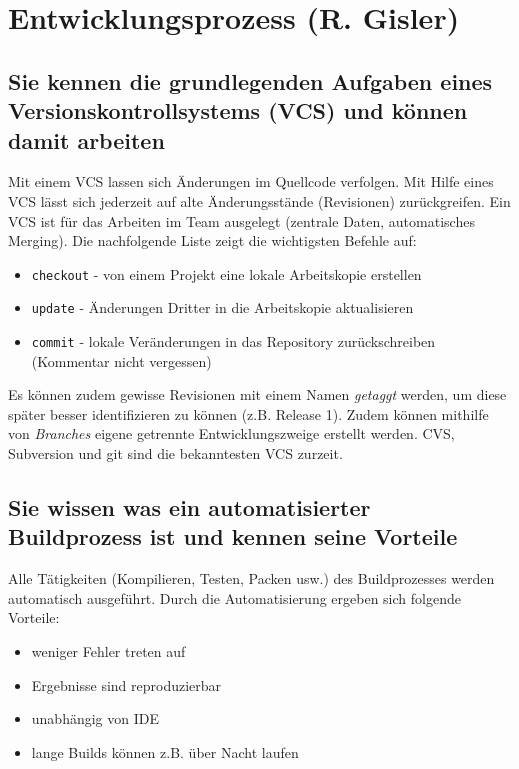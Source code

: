 \section{Entwicklungsprozess (R. Gisler)}
\label{sec:gisler}

\subsection{Sie kennen die grundlegenden Aufgaben eines Versionskontrollsystems (VCS) und können damit arbeiten}

Mit einem \ac{VCS} lassen sich Änderungen im Quellcode verfolgen. Mit Hilfe eines \ac{VCS} lässt sich jederzeit auf alte Änderungsstände (Revisionen) zurückgreifen. Ein \ac{VCS} ist für das Arbeiten im Team ausgelegt (zentrale Daten, automatisches Merging). Die nachfolgende Liste zeigt die wichtigsten Befehle auf:
\begin{itemize}
	\item \texttt{checkout} - von einem Projekt eine lokale Arbeitskopie erstellen
	\item \texttt{update} - Änderungen Dritter in die Arbeitskopie aktualisieren
	\item \texttt{commit} - lokale Veränderungen in das Repository zurückschreiben (Kommentar nicht vergessen)
\end{itemize}
Es können zudem gewisse Revisionen mit einem Namen \emph{getaggt} werden, um diese später besser identifizieren zu können (z.B. Release 1). Zudem können mithilfe von \emph{Branches} eigene getrennte Entwicklungszweige erstellt werden. CVS, Subversion und git sind die bekanntesten \ac{VCS} zurzeit. 

\subsection{Sie wissen was ein automatisierter Buildprozess ist und kennen seine Vorteile}

Alle Tätigkeiten (Kompilieren, Testen, Packen usw.) des Buildprozesses werden automatisch ausgeführt. Durch die Automatisierung ergeben sich folgende Vorteile:

\begin{itemize}
	\item weniger Fehler treten auf
	\item Ergebnisse sind reproduzierbar
	\item unabhängig von IDE
	\item lange Builds können z.B. über Nacht laufen
\end{itemize}

